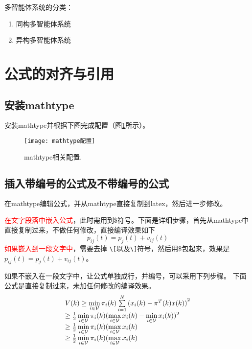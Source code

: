 \documentclass[master]{styles/hdu-thesis}
\begin{document}
多智能体系统的分类：
\begin{enumerate}
  \item 同构多智能体系统
  \item 异构多智能体系统
\end{enumerate}




\section{公式的对齐与引用}

\subsection{安装mathtype}
安装mathtype并根据下图完成配置（图\ref{fig_mathtype1}所示）。
 \begin{figure}[!htb]
  \centering
  \texttt{[image: mathtype配置]}
  \caption{mathtype相关配置.}
  \label{fig_mathtype1}
\end{figure}

\subsection{插入带编号的公式及不带编号的公式}
在mathtype编辑公式，并从mathtype直接复制到latex，然后进一步修改。

\textcolor{red}{在文字段落中嵌入公式}，此时需用到\$符号。下面是详细步骤，首先从mathtype中直接复制过来，不做任何修改，直接编译效果如下
\[{p_{ij}}(t) = {p_j}(t) + {v_{ij}}(t)\]
\textcolor{red}{如果嵌入到一段文字中}，需要去掉 \verb|\[|以及\verb|\]|符号，然后用\$包起来，效果是${p_{ij}}(t) = {p_j}(t) + {v_{ij}}(t)$。

如果不嵌入在一段文字中，让公式单独成行，并编号，可以采用下列步骤。
下面公式是直接复制过来，未加任何修改的编译效果。
\[\begin{array}{l}
V(k) \ge \mathop {\min }\limits_{i \in {\cal V}} {\pi _i}(k)\sum\limits_{i = 1}^N {{{({x_i}(k) - {\pi ^T}(k)x(k))}^2}} \\
 \ge \frac{1}{2}\mathop {\min }\limits_{i \in {\cal V}} {\pi _i}(k){(\mathop {\max }\limits_{i \in {\cal V}} {x_i}(k) - \mathop {\min }\limits_{i \in {\cal V}} {x_i}(k))^2}\\
 \ge \frac{1}{2}\mathop {\min }\limits_{i \in {\cal V}} {\pi _i}(k)(\mathop {\max }\limits_{i \in {\cal V}} {x_i}(k)\\
 \ge \frac{1}{2}\mathop {\min }\limits_{i \in {\cal V}} {\pi _i}(k)(\mathop {\max }\limits_{i \in {\cal V}} {x_i}(k)
\end{array}\]
\end{document}
